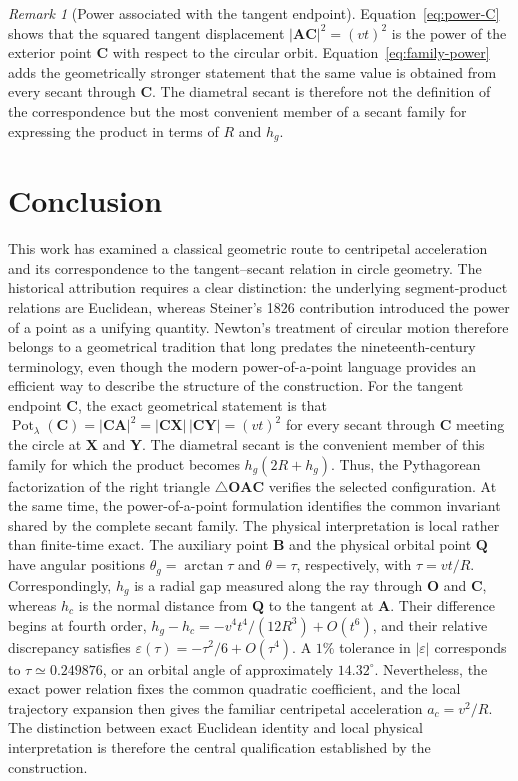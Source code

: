 \documentclass[preprint,12pt,3p,nopreprintline]{elsarticle}
\newcommand{\pt}[1]{\mathbf{#1}}
\newcommand{\seglen}[1]{\lvert\mathbf{#1}\rvert}
\DeclareMathOperator{\Pot}{Pot}
\numberwithin{equation}{section}
\theoremstyle{remark}
\newtheorem{remark}{Remark}[section]
\begin{document}
\begin{remark}[Power associated with the tangent endpoint]
\label{rem:ac-power}
Equation~\eqref{eq:power-C} shows that the squared tangent displacement $\seglen{AC}^{2}=(vt)^2$ is the power of the exterior point $\pt{C}$ with respect to the circular orbit. Equation~\eqref{eq:family-power} adds the geometrically stronger statement that the same value is obtained from every secant through $\pt{C}$. The diametral secant is therefore not the definition of the correspondence but the most convenient member of a secant family for expressing the product in terms of $R$ and $h_g$.
\end{remark}

\section{Conclusion}

This work has examined a classical geometric route to centripetal acceleration and its correspondence to the tangent--secant relation in circle geometry. The historical attribution requires a clear distinction: the underlying segment-product relations are Euclidean, whereas Steiner's 1826 contribution \cite{steiner1826einige} introduced the power of a point as a unifying quantity. Newton's treatment of circular motion therefore belongs to a geometrical tradition that long predates the nineteenth-century terminology, even though the modern power-of-a-point language provides an efficient way to describe the structure of the construction. For the tangent endpoint $\pt{C}$, the exact geometrical statement is that $\Pot_{\lambda}(\pt{C})=\seglen{CA}^{2}=\seglen{CX}\,\seglen{CY}=(vt)^2$ for every secant through $\pt{C}$ meeting the circle at $\pt{X}$ and $\pt{Y}$. The diametral secant is the convenient member of this family for which the product becomes $h_g(2R+h_g)$. Thus, the Pythagorean factorization of the right triangle $\triangle \mathbf{OAC}$ verifies the selected configuration. At the same time, the power-of-a-point formulation identifies the common invariant shared by the complete secant family. The physical interpretation is local rather than finite-time exact. The auxiliary point $\pt{B}$ and the physical orbital point $\pt{Q}$ have angular positions $\theta_g=\arctan\tau$ and $\theta=\tau$, respectively, with $\tau=vt/R$. Correspondingly, $h_g$ is a radial gap measured along the ray through $\pt{O}$ and $\pt{C}$, whereas $h_c$ is the normal distance from $\pt{Q}$ to the tangent at $\pt{A}$. Their difference begins at fourth order, $h_g-h_c=-v^4t^4/(12R^3)+O(t^6)$, and their relative discrepancy satisfies $\varepsilon(\tau)=-\tau^2/6+O(\tau^4)$. A $1\%$ tolerance in $|\varepsilon|$ corresponds to $\tau\simeq0.249876$, or an orbital angle of approximately $14.32^{\circ}$. Nevertheless, the exact power relation fixes the common quadratic coefficient, and the local trajectory expansion then gives the familiar centripetal acceleration $a_c=v^2/R$. The distinction between exact Euclidean identity and local physical interpretation is therefore the central qualification established by the construction.
\end{document}
